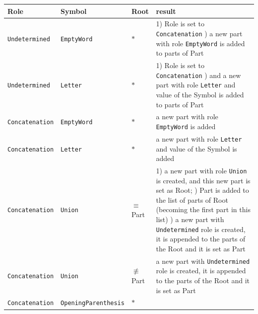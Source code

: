 \documentclass{article}
\begin{document}
\vspace{10pt} \noindent
\begin{tabularx}{\textwidth}{l|l|l|X}

Role & Symbol & Root & result \\ \hline

\verb|Undetermined| & \verb|EmptyWord| & $*$ &

1) Role is set to \verb|Concatenation| \newline
2) a new part with role \verb|EmptyWord| is added to parts of Part \\

\verb|Undetermined| & \verb|Letter| & $*$ &

1) Role is set to \verb|Concatenation| \newline
2) and a new part with role \verb|Letter| and value of the Symbol is added to parts of Part \\

\verb|Concatenation| & \verb|EmptyWord| & $*$ &

a new part with role \verb|EmptyWord| is added \\

\verb|Concatenation| & \verb|Letter| & $*$ &

a new part with role \verb|Letter| and value of the Symbol is added \\

\verb|Concatenation| & \verb|Union| & $\equiv$Part &

1) a new part with role \verb|Union| is created, and this new part is set as Root; \newline
2) Part is added to the list of parts of Root (becoming the first part in this list) \newline
3) a new part with \verb|Undetermined| role is created, it is appended to the parts of the Root and
it is set as Part \\

\verb|Concatenation| & \verb|Union| & $\not\equiv$Part &

a new part with \verb|Undetermined| role is created, it is appended to the parts of the Root and
it is set as Part \\

\verb|Concatenation| & \verb|OpeningParenthesis| & $*$ &


\end{tabularx}
\end{document}

